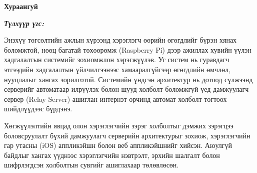 

\begin{center}
{\scshape\Large \univname\par} %
{\scshape\large \facname\par}\vspace{0.5cm} %
{\huge\textbf{{Хураангуй}} \par}
\bigskip
{\Large{\ttitle} \par} %
\bigskip

{\normalsize \shortname \par} %
\addressname
\end{center}

\textit{\textbf{Түлхүүр үгс: \keywordnames}}
\bigskip

Энэхүү төгсөлтийн ажлын хүрээнд хэрэглэгч өөрийн өгөгдлийг бүрэн хянах боломжтой, нөөц багатай төхөөрөмж (Raspberry Pi) дээр ажиллах хувийн үүлэн хадгалалтын системийг зохиомжлон хэрэгжүүлэв. Уг систем нь гуравдагч этгээдийн хадгалалтын үйлчилгээнээс хамааралгүйгээр өгөгдлийн өмчлөл, нууцлалыг хангах зорилготой. Системийн үндсэн архитектур нь дотоод сүлжээнд серверийг автоматаар илрүүлэх болон шууд холболт боломжгүй үед дамжуулагч сервер (Relay Server) ашиглан интернэт орчинд автомат холболт тогтоох шийдлүүдээс бүрдэнэ.

Хөгжүүлэлтийн явцад олон хэрэглэгчийн зэрэг холболтыг дэмжих зэрэгцээ боловсруулалт бүхий дамжуулагч серверийн архитектурыг зохиож, хэрэглэгчийн гар утасны (iOS) аппликэйшн болон веб аппликэйшнийг хийсэн. Аюулгүй байдлыг хангах үүднээс хэрэглэгчийн нэвтрэлт, эрхийн шалгалт болон шифрлэгдсэн холболтын сувгийг ашиглахаар төлөвлөсөн.

